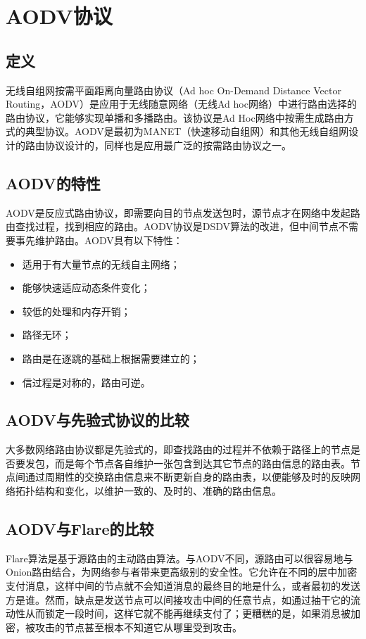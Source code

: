 \documentclass[12pt,a4paper]{article}
\begin{document}
\section{AODV协议}

\subsection{定义}
无线自组网按需平面距离向量路由协议（Ad hoc On-Demand Distance Vector Routing，AODV）是应用于无线随意网络（无线Ad hoc网络）中进行路由选择的路由协议，它能够实现单播和多播路由\cite{Perkins2003}。该协议是Ad Hoc网络中按需生成路由方式的典型协议。AODV是最初为MANET\cite{cs441_manet}（快速移动自组网）和其他无线自组网设计的路由协议设计的，同样也是应用最广泛的按需路由协议之一。

\subsection{AODV的特性}
AODV是反应式路由协议，即需要向目的节点发送包时，源节点才在网络中发起路由查找过程，找到相应的路由。AODV协议是DSDV算法的改进，但中间节点不需要事先维护路由。AODV具有以下特性：
\begin{itemize}
	\item 适用于有大量节点的无线自主网络；
	\item 能够快速适应动态条件变化；
	\item 较低的处理和内存开销；
	\item 路径无环；
	\item 路由是在逐跳的基础上根据需要建立的；
	\item 信过程是对称的，路由可逆。
\end{itemize}

\subsection{AODV与先验式协议的比较}
大多数网络路由协议都是先验式的，即查找路由的过程并不依赖于路径上的节点是否要发包，而是每个节点各自维护一张包含到达其它节点的路由信息的路由表。节点间通过周期性的交换路由信息来不断更新自身的路由表，以便能够及时的反映网络拓扑结构和变化，以维护一致的、及时的、准确的路由信息。

\subsection{AODV与Flare的比较}
Flare算法是基于源路由的主动路由算法。与AODV不同，源路由可以很容易地与Onion路由结合，为网络参与者带来更高级别的安全性。它允许在不同的层中加密支付消息，这样中间的节点就不会知道消息的最终目的地是什么，或者最初的发送方是谁。然而，缺点是发送节点可以间接攻击中间的任意节点，如通过抽干它的流动性从而锁定一段时间，这样它就不能再继续支付了；更糟糕的是，如果消息被加密，被攻击的节点甚至根本不知道它从哪里受到攻击。
\end{document}
